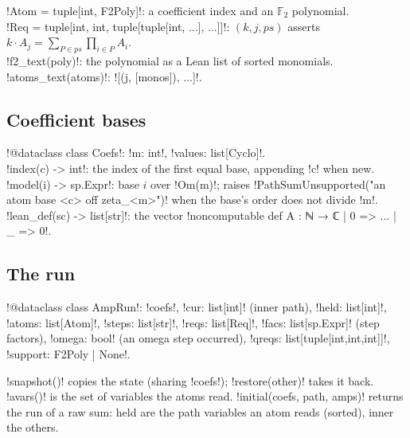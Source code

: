 {{{\begin{signature}
\lexpy!Atom = tuple[int, F2Poly]!: a coefficient index and an $\mathbb{F}_2$ polynomial.\\
\lexpy!Req = tuple[int, int, tuple[tuple[int, ...], ...]]!: $(k, j, ps)$ asserts
$k\cdot A_j = \sum_{P\in ps}\prod_{i\in P} A_i$.\\
\lexpy!f2_text(poly)!: the polynomial as a Lean list of sorted monomials.\\
\lexpy!atoms_text(atoms)!: \lexcode![(j, [monos]), ...]!.
\end{signature}

\subsection{Coefficient bases}

\begin{signature}
\lexpy!@dataclass class Coefs!: \lexpy!m: int!, \lexpy!values: list[Cyclo]!.\\
\lexpy!index(c) -> int!: the index of the first equal base, appending \lexpy!c! when new.\\
\lexpy!model(i) -> sp.Expr!: base $i$ over \lexpy!Om(m)!; raises
\lexcode!PathSumUnsupported("an atom base <c> off zeta_<m>")! when the base's order does not
divide \lexpy!m!.\\
\lexpy!lean_def(sc) -> list[str]!: the vector
\lexlean!noncomputable def A : ℕ → ℂ | 0 => ... | _ => 0!.
\end{signature}

\subsection{The run}

\begin{signature}
\lexpy!@dataclass class AmpRun!: \lexpy!coefs!, \lexpy!cur: list[int]! (inner path), \lexpy!held: list[int]!,
\lexpy!atoms: list[Atom]!, \lexpy!steps: list[str]!, \lexpy!reqs: list[Req]!,
\lexpy!facs: list[sp.Expr]! (step factors), \lexpy!omega: bool! (an omega step occurred),
\lexpy!qreqs: list[tuple[int,int,int]]!, \lexpy!support: F2Poly | None!.
\end{signature}
\lexpy!snapshot()! copies the state (sharing \lexpy!coefs!); \lexpy!restore(other)! takes it back.
\lexpy!avars()! is the set of variables the atoms read. \lexpy!initial(coefs, path, amps)! returns
the run of a raw sum: held are the path variables an atom reads (sorted), inner the others.

}}}

